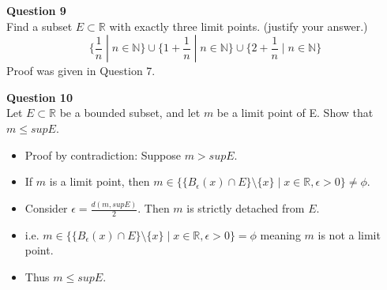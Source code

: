 \documentclass[12pt]{article}
\begin{document}
\vspace{1.5\baselineskip}

\textbf{Question 9}\\
Find a subset $E \subset \mathbb{R}$ with exactly three limit points. (justify your answer.)
$$
\{\frac{1}{n} \;|\; n\in\mathbb{N} \} \cup \{1+\frac{1}{n}\;|\; n\in\mathbb{N} \} \cup \{2+\frac{1}{n} \;|\; n\in\mathbb{N} \}
$$
Proof was given in Question 7.

\newpage
\textbf{Question 10}\\
Let $E \subset \mathbb{R}$ be a bounded subset, and let $m$ be a limit point of E. Show that $m \le supE$.
\begin{itemize}
    \item Proof by contradiction: Suppose $m > supE$.
    \item If $m$ is a limit point, then $m\in \{\{B_\epsilon (x) \cap E\}\setminus\{x\}\;|\; x\in \mathbb{R}, \epsilon >0 \} \neq \phi$.
    \item Consider $\epsilon = \frac{d(m, supE)}{2}$. Then $m$ is strictly detached from $E$.
    \item i.e. $m\in \{\{B_\epsilon (x) \cap E\}\setminus\{x\}\;|\; x\in \mathbb{R}, \epsilon >0 \} = \phi$ meaning $m$ is not a limit point.
    \item Thus $m \le supE$.
\end{itemize}
\end{document}
